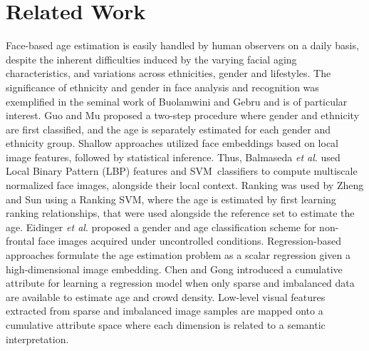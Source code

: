 \documentclass[10pt,twocolumn,letterpaper]{article}
\begin{document}
\section{Related Work}

\label{sec:Related Work}

Face-based age estimation is easily handled by human observers on a daily
basis, despite the inherent difficulties induced by the varying facial aging
characteristics, and variations across ethnicities, gender and lifestyles.
The significance of ethnicity and gender in face analysis and recognition
was exemplified in the seminal work of Buolamwini and Gebru \cite{Gebru} and
is of particular interest. Guo and Mu \cite{guo2010human} proposed a
two-step procedure where gender and ethnicity are first classified, and the
age is separately estimated for each gender and ethnicity group. Shallow
approaches utilized face embeddings based on local image features, followed
by statistical inference. Thus, Balmaseda \emph{et al}. \cite {ramon2012gender} used Local Binary Pattern (LBP) features and SVM\
classifiers to compute multiscale normalized face images, alongside their
local context. Ranking was used by Zheng and Sun \cite{ZhengSun2012} using a
Ranking SVM, where the age is estimated by first learning ranking
relationships, that were used alongside the reference set to estimate the
age. Eidinger \emph{et al}. \cite{eidinger2014age} proposed a gender and age
classification scheme for non-frontal face images acquired under
uncontrolled conditions. Regression-based approaches formulate the age
estimation problem as a scalar regression given a high-dimensional image
embedding. Chen and Gong \cite{ChenGong2013} introduced a cumulative
attribute for learning a regression model when only sparse and imbalanced
data are available to estimate age and crowd density. Low-level visual
features extracted from sparse and imbalanced image samples are mapped onto
a cumulative attribute space where each dimension is related to a semantic
interpretation.
\end{document}
